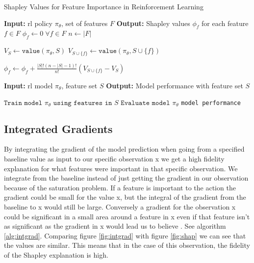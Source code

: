 \documentclass[UKenglish]{uiomasterthesis}
\begin{document}
\begin{algorithm}
\caption{Shapley Values for Feature Importance in Reinforcement Learning}
\label{alg:shapley}
\begin{algorithmic}
    \State \textbf{Input:} \ac{rl} policy $\pi_\theta$, set of features $F$
    \State \textbf{Output:} Shapley values $\phi_f$ for each feature $f \in F$
    \State $\phi_f \gets 0 \; \forall f \in F$ 
    \State $n \gets |F|$ 
    
            \State $V_S \gets \texttt{value}(\pi_\theta, S)$ 
            \State $V_{S \cup \{f\}} \gets \texttt{value}(\pi_\theta, S \cup \{f\})$ 
            
            \State $\phi_f \gets \phi_f + \frac{|S|!(n - |S| - 1)!}{n!} \left(V_{S \cup \{f\}} - V_S\right)$
        \EndFor
    \EndFor
    
        \State \textbf{Input:} \ac{rl} model $\pi_\theta$, feature set $S$
        \State \textbf{Output:} Model performance with feature set $S$
        
        \State $\texttt{Train model } \pi_\theta \texttt{ using features in } S$
        \State $\texttt{Evaluate model } \pi_\theta$
        \State \Return \texttt{model performance}
    \EndFunction
\end{algorithmic}
\end{algorithm}

\subsection{Integrated Gradients}
\label{sec:intgrad}
By integrating the gradient of the model prediction when going from a specified baseline value as input to our specific observation x we get a high fidelity explanation for what features were important in that specific observation. We integrate from the baseline instead of just getting the gradient in our observation because of the saturation problem. If a feature is important to the action the gradient could be small for the value x, but the integral of the gradient from the baseline to x would still be large. Conversely a gradient for the observation x could be significant in a small area around a feature in x even if that feature isn't as significant as the gradient in x would lead us to believe \cite{sundararajan2017axiomaticattributiondeepnetworks}. See algorithm \ref{alg:intgrad}. Comparing figure \ref{fig:intgrad} with figure \ref{fig:shap} we can see that the values are similar. This means that in the case of this observation, the fidelity of the Shapley explanation is high.
\end{document}
